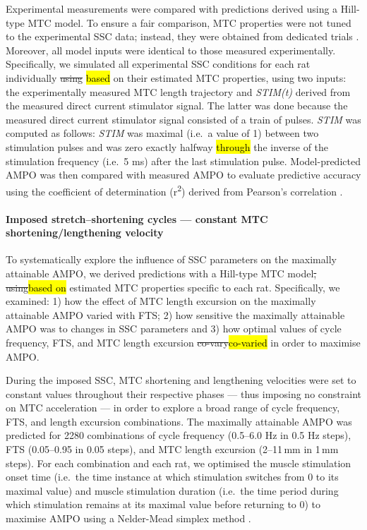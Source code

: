 \documentclass[
  10pt,
  letterpaper,
]{article}
\begin{document}
Experimental measurements were compared with predictions derived using a
Hill-type MTC model. To ensure a fair comparison, MTC properties were
not tuned to the experimental SSC data; instead, they were obtained from
dedicated trials \citep[see][]{reuvers_accuracy_2025}. Moreover, all
model inputs were identical to those measured experimentally.
Specifically, we simulated all experimental SSC conditions for each rat
individually \st{using} \hl{based} on their estimated MTC properties,
using two inputs: the experimentally measured MTC length trajectory and
\emph{STIM(t)} derived from the measured direct current stimulator
signal. The latter was done because the measured direct current
stimulator signal consisted of a train of pulses. \emph{STIM} was
computed as follows: \emph{STIM} was maximal (i.e.~a value of 1) between
two stimulation pulses and was zero exactly halfway \hl{through} the
inverse of the stimulation frequency (i.e.~5 ms) after the last
stimulation pulse. Model-predicted AMPO was then compared with measured
AMPO to evaluate predictive accuracy using the coefficient of
determination (r\textsuperscript{2}) derived from Pearson's correlation
\citep{pearson_vii_1896}.

\paragraph{Imposed stretch--shortening cycles --- constant MTC
shortening/lengthening
velocity}\label{imposed-stretchshortening-cycles-constant-mtc-shorteninglengthening-velocity}

To systematically explore the influence of SSC parameters on the
maximally attainable AMPO, we derived predictions with a Hill-type MTC
model\st{, using}\hl{based on} estimated MTC properties specific to each
rat. Specifically, we examined: 1) how the effect of MTC length
excursion on the maximally attainable AMPO varied with FTS; 2) how
sensitive the maximally attainable AMPO was to changes in SSC parameters
and 3) how optimal values of cycle frequency, FTS, and MTC length
excursion \st{co-vary}\hl{co-varied} in order to maximise AMPO.

During the imposed SSC, MTC shortening and lengthening velocities were
set to constant values throughout their respective phases --- thus
imposing no constraint on MTC acceleration --- in order to explore a
broad range of cycle frequency, FTS, and length excursion combinations.
The maximally attainable AMPO was predicted for 2280 combinations of
cycle frequency (0.5--6.0 Hz in 0.5 Hz steps), FTS (0.05--0.95 in 0.05
steps), and MTC length excursion (2--11\,mm in 1\,mm steps). For each
combination and each rat, we optimised the muscle stimulation onset time
(i.e.~the time instance at which stimulation switches from 0 to its
maximal value) and muscle stimulation duration (i.e.~the time period
during which stimulation remains at its maximal value before returning
to 0) to maximise AMPO using a Nelder-Mead simplex method
\citep{gao_implementing_2012}.
\end{document}
